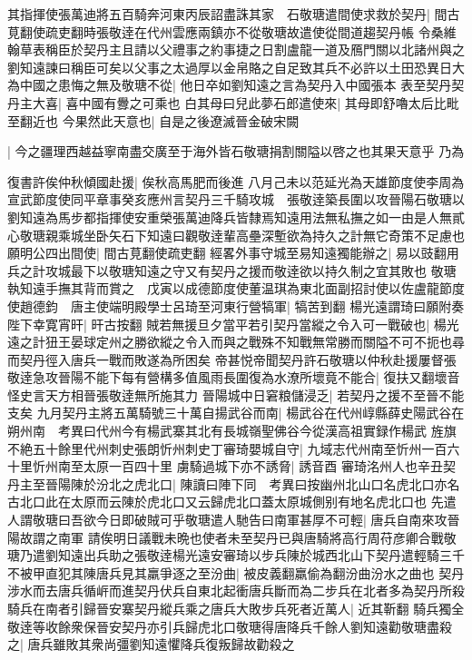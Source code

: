 其指揮使張萬迪將五百騎奔河東丙辰詔盡誅其家　石敬瑭遣間使求救於契丹|{
	間古莧翻使疏吏翻時張敬逹在代州雲應兩鎮亦不從敬瑭故遣使從間道趨契丹帳}
令桑維翰草表稱臣於契丹主且請以父禮事之約事捷之日割盧龍一道及鴈門關以北諸州與之劉知遠諫曰稱臣可矣以父事之太過厚以金帛賂之自足致其兵不必許以土田恐異日大為中國之患悔之無及敬瑭不從|{
	他日卒如劉知遠之言為契丹入中國張本}
表至契丹契丹主大喜|{
	喜中國有釁之可乘也}
白其母曰兒此夢石郎遣使來|{
	其母即舒嚕太后比毗至翻近也}
今果然此天意也|{
	自是之後遼滅晉金破宋闕}


|{
	今之疆理西越益寧南盡交廣至于海外皆石敬瑭捐割關隘以啓之也其果天意乎}
乃為

復書許俟仲秋傾國赴援|{
	俟秋高馬肥而後進}
八月己未以范延光為天雄節度使李周為宣武節度使同平章事癸亥應州言契丹三千騎攻城　張敬逹築長圍以攻晉陽石敬瑭以劉知遠為馬步都指揮使安重榮張萬迪降兵皆隸焉知遠用法無私撫之如一由是人無貳心敬瑭親乘城坐卧矢石下知遠曰觀敬逹輩高壘深塹欲為持久之計無它奇策不足慮也願明公四出間使|{
	間古莧翻使疏吏翻}
經畧外事守城至易知遠獨能辦之|{
	易以豉翻用兵之計攻城最下以敬瑭知遠之守又有契丹之援而敬逹欲以持久制之宜其敗也}
敬瑭執知遠手撫其背而賞之　戊寅以成德節度使董温琪為東北面副招討使以佐盧龍節度使趙德鈞　唐主使端明殿學士呂琦至河東行營犒軍|{
	犒苦到翻}
楊光遠謂琦曰願附奏陛下幸寛宵旰|{
	旰古按翻}
賊若無援旦夕當平若引契丹當縱之令入可一戰破也|{
	楊光遠之計狃王晏球定州之勝欲縱之令入而與之戰殊不知戰無常勝而關隘不可不扼也尋而契丹徑入唐兵一戰而敗遂為所困矣}
帝甚悦帝聞契丹許石敬瑭以仲秋赴援屢督張敬逹急攻晉陽不能下每有營構多值風雨長圍復為水潦所壞竟不能合|{
	復扶又翻壞音怪史言天方相晉張敬逹無所施其力}
晉陽城中日窘粮儲浸乏|{
	若契丹之援不至晉不能支矣}
九月契丹主將五萬騎號三十萬自揚武谷而南|{
	楊武谷在代州崞縣薛史陽武谷在朔州南　考異曰代州今有楊武寨其北有長城嶺聖佛谷今從漢高祖實録作楊武}
旌旗不絶五十餘里代州刺史張朗忻州刺史丁審琦嬰城自守|{
	九域志代州南至忻州一百六十里忻州南至太原一百四十里}
虜騎過城下亦不誘脅|{
	誘音酉}
審琦洺州人也辛丑契丹主至晉陽陳於汾北之虎北口|{
	陳讀曰陣下同　考異曰按幽州北山口名虎北口亦名古北口此在太原而云陳於虎北口又云歸虎北口蓋太原城側别有地名虎北口也}
先遣人謂敬瑭曰吾欲今日即破賊可乎敬瑭遣人馳告曰南軍甚厚不可輕|{
	唐兵自南來攻晉陽故謂之南軍}
請俟明日議戰未晩也使者未至契丹已與唐騎將高行周苻彦卿合戰敬瑭乃遣劉知遠出兵助之張敬逹楊光遠安審琦以步兵陳於城西北山下契丹遣輕騎三千不被甲直犯其陳唐兵見其羸爭逐之至汾曲|{
	被皮義翻羸偷為翻汾曲汾水之曲也}
契丹涉水而去唐兵循㟁而進契丹伏兵自東北起衝唐兵斷而為二步兵在北者多為契丹所殺騎兵在南者引歸晉安寨契丹縱兵乘之唐兵大敗步兵死者近萬人|{
	近其靳翻}
騎兵獨全敬逹等收餘衆保晉安契丹亦引兵歸虎北口敬瑭得唐降兵千餘人劉知遠勸敬瑭盡殺之|{
	唐兵雖敗其衆尚彊劉知遠懼降兵復叛歸故勸殺之}
